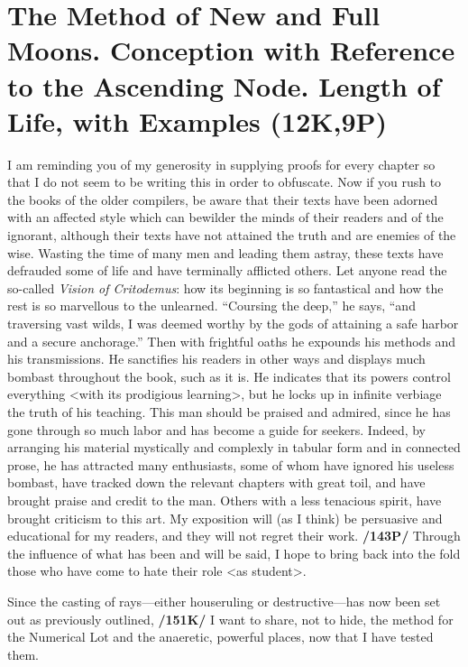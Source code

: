 \section{The Method of New and Full Moons. Conception with Reference to the Ascending Node. Length of Life, with Examples (12K,9P)}

I am reminding you of my generosity in supplying proofs for every chapter so that I do not seem to be writing this in order to obfuscate. Now if you rush to the books of the older compilers, be aware that their texts have been adorned with an affected style which can bewilder the minds of their readers and of the ignorant, although their texts have not attained the truth and are enemies of the wise. Wasting the time of
many men and leading them astray, these texts have defrauded some of life and have terminally afflicted others. 
Let anyone read the so-called  \textit{Vision of Critodemus}: how its beginning is so fantastical and how the rest is so marvellous to the unlearned. “Coursing the deep,” he says, “and traversing vast wilds, I was deemed worthy by the gods of attaining a safe harbor and a secure anchorage.” Then with frightful oaths he expounds his methods and his transmissions. He sanctifies his readers in other ways and displays much
bombast throughout the book, such as it is. He indicates that its powers control everything <with its prodigious learning>, but he locks up in infinite verbiage the truth of his teaching. This man should be praised and admired, since he has gone through so much labor and has become a guide for seekers. Indeed, by arranging his material mystically and complexly in tabular form and in connected prose, he has attracted many enthusiasts, some of whom have ignored his useless bombast, have tracked down the relevant chapters with great toil, and have brought praise and credit to the man. Others with a less tenacious spirit, have brought criticism to this art. My exposition will (as I think) be persuasive and educational for my readers, and they will not regret
their work. \textbf{/143P/} Through the influence of what has been and will be said, I hope to bring back into the fold those who have come to hate their role <as student>.

Since the casting of rays—either houseruling or destructive—has now been set out as previously outlined, \textbf{/151K/} I want to share, not to hide, the method for the Numerical Lot and the anaeretic, powerful places, now that I have tested them. 


